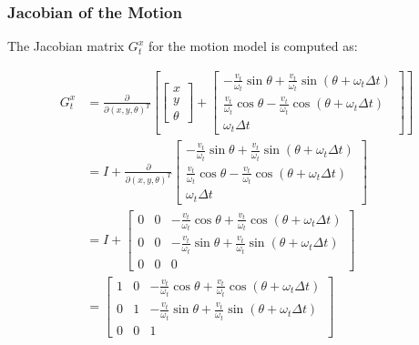 \begin{frame}
    \frametitle{Jacobian of the Motion}
    
    The Jacobian matrix \( G_t^x \) for the motion model is computed as:
    
    \begin{align*}
        G_t^x &= \frac{\partial}{\partial(x, y, \theta)^T} \left[
        \begin{bmatrix}
        x \\
        y \\
        \theta
        \end{bmatrix}
        +
        \begin{bmatrix}
        -\frac{v_t}{\omega_t} \sin \theta + \frac{v_t}{\omega_t} \sin(\theta + \omega_t \Delta t) \\
        \frac{v_t}{\omega_t} \cos \theta - \frac{v_t}{\omega_t} \cos(\theta + \omega_t \Delta t) \\
        \omega_t \Delta t
        \end{bmatrix}
        \right] \\
        &= I + \frac{\partial}{\partial(x, y, \theta)^T} 
        \begin{bmatrix}
        -\frac{v_t}{\omega_t} \sin \theta + \frac{v_t}{\omega_t} \sin(\theta + \omega_t \Delta t) \\
        \frac{v_t}{\omega_t} \cos \theta - \frac{v_t}{\omega_t} \cos(\theta + \omega_t \Delta t) \\
        \omega_t \Delta t
        \end{bmatrix} \\
        &= I + 
        \begin{bmatrix}
        0 & 0 & -\frac{v_t}{\omega_t} \cos \theta + \frac{v_t}{\omega_t} \cos(\theta + \omega_t \Delta t) \\
        0 & 0 & -\frac{v_t}{\omega_t} \sin \theta + \frac{v_t}{\omega_t} \sin(\theta + \omega_t \Delta t) \\
        0 & 0 & 0
        \end{bmatrix} \\
        &= 
        \begin{bmatrix}
        1 & 0 & -\frac{v_t}{\omega_t} \cos \theta + \frac{v_t}{\omega_t} \cos(\theta + \omega_t \Delta t) \\
        0 & 1 & -\frac{v_t}{\omega_t} \sin \theta + \frac{v_t}{\omega_t} \sin(\theta + \omega_t \Delta t) \\
        0 & 0 & 1
        \end{bmatrix}
    \end{align*}
    
\end{frame}

